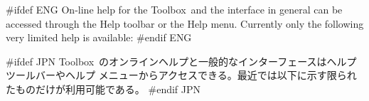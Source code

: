 \documentclass[\pformat,12pt]{article}
\newcommand{\Toolbox}{Toolbox}
\newcommand{\Toolbox}{Toolbox}
\newcommand{\guicmd}[1]{{\sf #1}}
\newcommand{\guicmd}[1]{{\gt #1}}
\begin{document}
%



#ifdef ENG
On-line help for the \Toolbox\ and the interface in general can %
be accessed through the \guicmd{Help} toolbar or
the \guicmd{Help} menu. Currently only the following
very limited help is available:
#endif ENG

#ifdef JPN
\Toolbox\ のオンラインヘルプと一般的なインターフェースは\guicmd{ヘルプ}ツールバーや\guicmd{ヘルプ}
メニューからアクセスできる。最近では以下に示す限られたものだけが利用可能である。
#endif JPN
\end{document}
